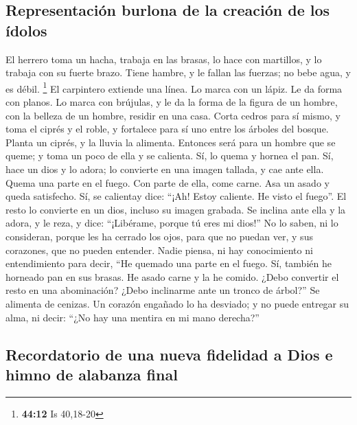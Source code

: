 \begin{paracol}{2}
\hypertarget{representaciuxf3n-burlona-de-la-creaciuxf3n-de-los-uxeddolos}{%
\subsection{Representación burlona de la creación de los
ídolos}\label{representaciuxf3n-burlona-de-la-creaciuxf3n-de-los-uxeddolos}}

 El herrero toma un hacha, trabaja en las brasas, lo hace
con martillos, y lo trabaja con su fuerte brazo. Tiene hambre, y le
fallan las fuerzas; no bebe agua, y es débil. \footnote{\textbf{44:12}
  Is 40,18-20}  El carpintero extiende una línea. Lo
marca con un lápiz. Le da forma con planos. Lo marca con brújulas, y le
da la forma de la figura de un hombre, con la belleza de un hombre,
residir en una casa.  Corta cedros para sí mismo, y toma
el ciprés y el roble, y fortalece para sí uno entre los árboles del
bosque. Planta un ciprés, y la lluvia la alimenta. 
Entonces será para un hombre que se queme; y toma un poco de ella y se
calienta. Sí, lo quema y hornea el pan. Sí, hace un dios y lo adora; lo
convierte en una imagen tallada, y cae ante ella.  Quema
una parte en el fuego. Con parte de ella, come carne. Asa un asado y
queda satisfecho. Sí, se calientay dice: ``¡Ah! Estoy caliente. He visto
el fuego''.  El resto lo convierte en un dios, incluso su
imagen grabada. Se inclina ante ella y la adora, y le reza, y dice:
``¡Libérame, porque tú eres mi dios!''  No lo saben, ni
lo consideran, porque les ha cerrado los ojos, para que no puedan ver, y
sus corazones, que no pueden entender.  Nadie piensa, ni
hay conocimiento ni entendimiento para decir, ``He quemado una parte en
el fuego. Sí, también he horneado pan en sus brasas. He asado carne y la
he comido. ¿Debo convertir el resto en una abominación? ¿Debo inclinarme
ante un tronco de árbol?''  Se alimenta de cenizas. Un
corazón engañado lo ha desviado; y no puede entregar su alma, ni decir:
``¿No hay una mentira en mi mano derecha?''

\hypertarget{recordatorio-de-una-nueva-fidelidad-a-dios-e-himno-de-alabanza-final}{%
\subsection{Recordatorio de una nueva fidelidad a Dios e himno de
alabanza
final}\label{recordatorio-de-una-nueva-fidelidad-a-dios-e-himno-de-alabanza-final}}


\end{paracol}
